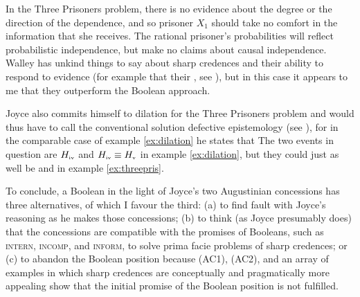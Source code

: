 \documentclass[11pt]{article}
\begin{document}
In the Three Prisoners problem, there is no evidence about the degree
or the direction of the dependence, and so prisoner $X_{1}$ should
take no comfort in the information that she receives. The rational
prisoner's probabilities will reflect probabilistic independence, but
make no claims about causal independence. Walley has unkind things to
say about sharp credences and their ability to respond to evidence
(for example that their ,
see ), but in this case it appears to me that
they outperform the Boolean approach.

Joyce also commits himself to dilation for the Three Prisoners problem
and would thus have to call the conventional solution defective
epistemology (see ), for in the comparable case
of example \ref{ex:dilation} he states that   The two events
in question are $H_{\mbox{\tiny{iv}}}$ and
$H_{\mbox{\tiny{iv}}}\equiv{}H_{\mbox{\tiny{v}}}$ in example
\ref{ex:dilation}, but they could just as well be  and  in
example \ref{ex:threepris}.

To conclude, a Boolean in the light of Joyce's two Augustinian
concessions has three alternatives, of which I favour the third: (a)
to find fault with Joyce's reasoning as he makes those concessions;
(b) to think (as Joyce presumably does) that the concessions are
compatible with the promises of Booleans, such as \textsc{intern},
\textsc{incomp}, and \textsc{inform}, to solve prima facie problems of
sharp credences; or (c) to abandon the Boolean position because (AC1),
(AC2), and an array of examples in which sharp credences are
conceptually and pragmatically more appealing show that the initial
promise of the Boolean position is not fulfilled.

 

\end{document}
